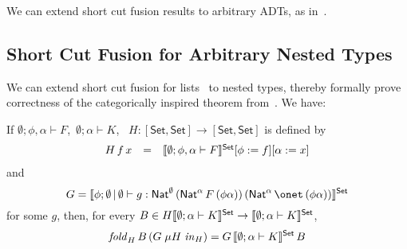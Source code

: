 \documentclass[runningheads]{llncs}
\newcommand{\set}{\mathsf{Set}}
\begin{document}
We can extend short cut fusion results to arbitrary ADTs, as
in~\cite{joh02,pit98}.



\subsection{Short Cut Fusion for Arbitrary Nested
  Types}\label{sec:short-cut-nested} 

We can extend short cut fusion for lists~\cite{glp93} to nested types,
thereby formally prove correctness of the categorically inspired
theorem from~\cite{jg10}.  We have:
\begin{theorem}\label{thm:short-cut-nested}
If $\emptyset;\phi,\alpha \vdash F$, \,$\emptyset; \alpha
\vdash K$, \,
$H : [\set,\set] \to [\set,\set]$ is defined by
\[\begin{array}{lll}
H\,f\,x & = & \setsem{\emptyset; \phi, \alpha \vdash F}[\phi :=
  f][\alpha := x]\\
\end{array}\]
and 
\[G = \setsem{\phi;\emptyset\,|\,\emptyset \vdash g :
\Nat^\emptyset\,(\Nat^\alpha\,F\,(\phi\alpha))\,(\Nat^\alpha\,\onet \,
(\phi\alpha))}\] for some $g$, then, for every $B \in H
\setsem{\emptyset;\alpha \vdash K} \rightarrow \setsem{\emptyset;
  \alpha \vdash K}$,
$$\mathit{fold}_{H}\, B \, (G\; \mu H \; \mathit{in}_{H}) = G
\,\setsem{\emptyset;\alpha \vdash K}\, B$$
\end{theorem}
\end{document}
